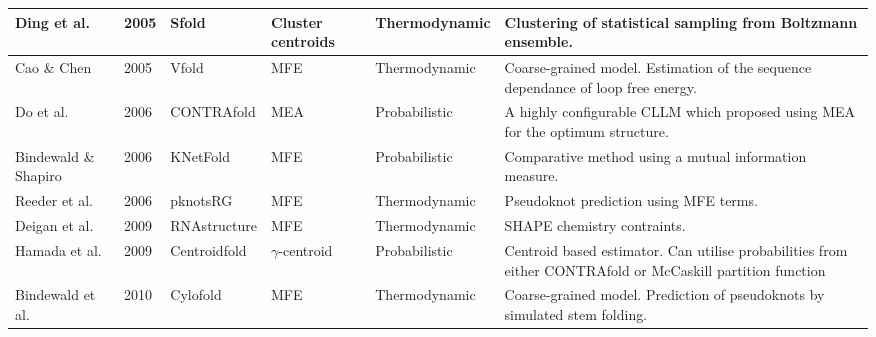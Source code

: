 \documentclass[journal]{IEEEtran}
\begin{document}
\begin{table}[t]
\begin{tabular}{|l|l|l|l|l|p{5cm}|}
Ding et al. \cite{ding2003statistical, ding2005rna}              & 2005          & Sfold              & Cluster centroids    & Thermodynamic             & Clustering of statistical sampling from Boltzmann ensemble.                                                \\ \hline
Cao \& Chen \cite{cao2005predicting}                             & 2005          & Vfold              & MFE                  & Thermodynamic             & Coarse-grained model. Estimation of the sequence dependance of loop free energy.                           \\ \hline
Do et al. \cite{do2006contrafold}                                & 2006          & CONTRAfold         & MEA                  & Probabilistic             & A highly configurable CLLM which proposed using MEA for the optimum structure.                             \\ \hline
Bindewald \& Shapiro \cite{bindewald2006rna}                     & 2006          & KNetFold           & MFE                  & Probabilistic             & Comparative method using a mutual information measure.                                                     \\ \hline
Reeder et al. \cite{reeder2007pknotsrg}                          & 2006          & pknotsRG           & MFE                  & Thermodynamic             & Pseudoknot prediction using MFE terms.                                                                     \\ \hline
Deigan et al. \cite{deigan2009accurate}                          & 2009          & RNAstructure       & MFE                  & Thermodynamic             & SHAPE chemistry contraints.                                                                                \\ \hline
Hamada et al. \cite{hamada2009prediction, sato2009centroidfold}  & 2009          & Centroidfold       & $\gamma$-centroid    & Probabilistic             & Centroid based estimator. Can utilise probabilities from either CONTRAfold or McCaskill partition function \\ \hline
Bindewald et al. \cite{bindewald2010cylofold}                    & 2010          & Cylofold           & MFE                  & Thermodynamic             & Coarse-grained model. Prediction of pseudoknots by simulated stem folding.                                 \\ \hline
\end{tabular}
\end{table}
\end{document}
